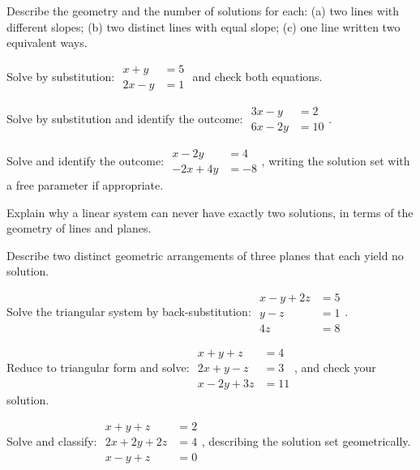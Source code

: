 \documentclass[12pt]{book}
\begin{document}
\begin{exercises}
\item Describe the geometry and the number of solutions for each:
(a) two lines with different slopes; (b) two distinct lines with equal slope;
(c) one line written two equivalent ways.

\item Solve by substitution: $\begin{aligned}x+y&=5\\ 2x-y&=1\end{aligned}$ and check
both equations.

\item Solve by substitution and identify the outcome:
$\begin{aligned}3x-y&=2\\ 6x-2y&=10\end{aligned}$.

\item Solve and identify the outcome:
$\begin{aligned}x-2y&=4\\ -2x+4y&=-8\end{aligned}$, writing the solution set with a
free parameter if appropriate.

\item Explain why a linear system can never have exactly two solutions, in terms of
the geometry of lines and planes.

\item Describe two distinct geometric arrangements of three planes that each yield no
solution.

\item Solve the triangular system by back-substitution:
$\begin{aligned}x-y+2z&=5\\ y-z&=1\\ 4z&=8\end{aligned}$.

\item Reduce to triangular form and solve:
$\begin{aligned}x+y+z&=4\\ 2x+y-z&=3\\ x-2y+3z&=11\end{aligned}$, and check your
solution.

\item Solve and classify:
$\begin{aligned}x+y+z&=2\\ 2x+2y+2z&=4\\ x-y+z&=0\end{aligned}$, describing the
solution set geometrically.


\end{exercises}
\end{document}
